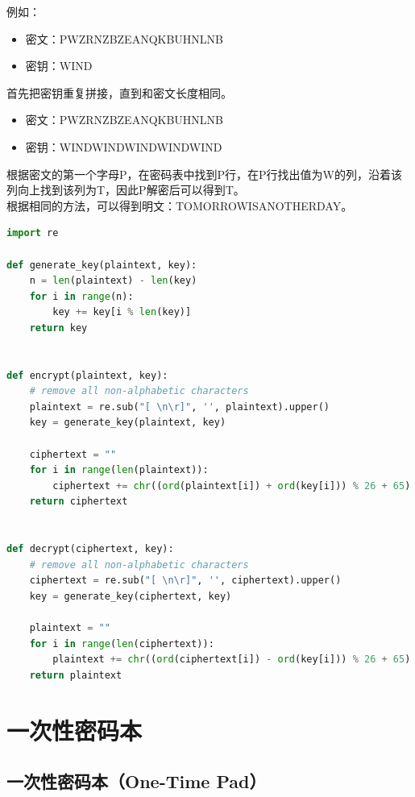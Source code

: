 例如：

\begin{itemize}
    \item 密文：PWZRNZBZEANQKBUHNLNB
    \item 密钥：WIND
\end{itemize}

首先把密钥重复拼接，直到和密文长度相同。

\begin{itemize}
    \item 密文：PWZRNZBZEANQKBUHNLNB
    \item 密钥：WINDWINDWINDWINDWIND
\end{itemize}

根据密文的第一个字母P，在密码表中找到P行，在P行找出值为W的列，沿着该列向上找到该列为T，因此P解密后可以得到T。\\

根据相同的方法，可以得到明文：TOMORROWISANOTHERDAY。\\


\begin{lstlisting}[language=Python]
import re

def generate_key(plaintext, key):
    n = len(plaintext) - len(key)
    for i in range(n): 
        key += key[i % len(key)]
    return key


def encrypt(plaintext, key):
    # remove all non-alphabetic characters
    plaintext = re.sub("[ \n\r]", '', plaintext).upper()
    key = generate_key(plaintext, key)

    ciphertext = ""
    for i in range(len(plaintext)):
        ciphertext += chr((ord(plaintext[i]) + ord(key[i])) % 26 + 65)
    return ciphertext


def decrypt(ciphertext, key):
    # remove all non-alphabetic characters
    ciphertext = re.sub("[ \n\r]", '', ciphertext).upper()
    key = generate_key(ciphertext, key)

    plaintext = ""
    for i in range(len(ciphertext)):
        plaintext += chr((ord(ciphertext[i]) - ord(key[i])) % 26 + 65)
    return plaintext
\end{lstlisting}

\newpage

\section{一次性密码本}

\subsection{一次性密码本（One-Time Pad）}

